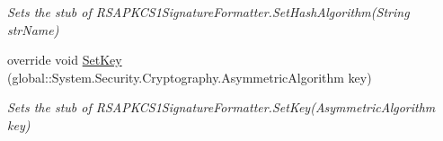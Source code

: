 \begin{DoxyCompactItemize}
\begin{DoxyCompactList}\small\item\em Sets the stub of R\-S\-A\-P\-K\-C\-S1\-Signature\-Formatter.\-Set\-Hash\-Algorithm(\-String str\-Name)\end{DoxyCompactList}\item 
override void \hyperlink{class_system_1_1_security_1_1_cryptography_1_1_fakes_1_1_stub_r_s_a_p_k_c_s1_signature_formatter_a9e337c534b73e394a77a8c51d1a41c92}{Set\-Key} (global\-::\-System.\-Security.\-Cryptography.\-Asymmetric\-Algorithm key)
\begin{DoxyCompactList}\small\item\em Sets the stub of R\-S\-A\-P\-K\-C\-S1\-Signature\-Formatter.\-Set\-Key(\-Asymmetric\-Algorithm key)\end{DoxyCompactList}\end{DoxyCompactItemize}
